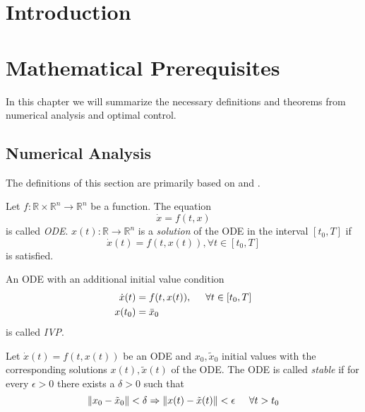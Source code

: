 \documentclass[a4paper, 12pt]{scrreprt} %
\begin{document}
\chapter{Introduction}
\label{chap:Introduction}


\chapter{Mathematical Prerequisites}
\label{chap:mp}
In this chapter we will summarize the necessary definitions and theorems from numerical analysis and optimal control.

\section{Numerical Analysis}
\label{sec:na}
The definitions of this section are primarily based on \cite{sodei} and \cite{ngd}.
\begin{definition}
Let $f:\mathbb R \times \mathbb R^n \to \mathbb R^n$ be a function. The equation
\begin{equation}
\dot{x} = f(t,x)
\label{eq:ODE}
\end{equation}
is called \emph{\ac{ODE}}. $x(t):\mathbb R \to \mathbb R^n$ is a \emph{solution} of the \ac{ODE} in the interval $[t_0, T]$ if
\begin{equation}
\dot x(t) = f\left(t,x(t)\right), \forall t \in [t_0, T]
\label{eq:ODE2}
\end{equation}
is satisfied.
\end{definition}

\begin{definition}
An \ac{ODE} with an additional initial value condition 
\begin{align}
\label{eq:ivp}
\begin{split}
\dot{x}(t) &= f(t, x(t)), \hspace{0.5cm} \forall t \in [t_0, T]\\
x(t_0) &= \bar x_0
\end{split}
\end{align}
is called \emph{\ac{IVP}}.
\end{definition}

\begin{definition}[Stability]
Let $\dot x(t) = f\left(t,x(t)\right)$ be an \ac{ODE} and $x_0, \tilde{x}_0$ initial values with the corresponding solutions $x(t), \tilde{x}(t)$ of the \ac{ODE}. The \ac{ODE} is called \emph{stable} if for every $\epsilon > 0$ there exists a $\delta > 0$ such that
\begin{equation}
\Vert x_0 - \tilde{x}_0 \Vert < \delta \Rightarrow \Vert x(t) - \tilde{x}(t) \Vert < \epsilon \hspace{0.5cm} \forall t > t_0
\label{eq:Stab}
\end{equation}
\end{definition}
\end{document}
